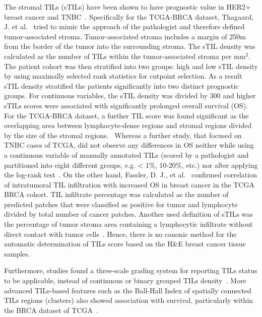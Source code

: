 The stromal TILs (sTILs) have been shown to have prognostic value in HER2+ breast cancer and TNBC~\cite{kos2020pitfalls}. 
Specifically for the TCGA-BRCA dataset, Thagaard, J. et al.~\cite{thagaard2021automated} tried to mimic the approach of the pathologist and therefore defined tumor-associated stroma. Tumor-associated stroma includes a margin of 250\textmu m from the border of the tumor into the surrounding stroma. The sTIL density was calculated as the number of TILs within the tumor-associated stroma per mm$^2$. The patient cohort was then stratified into two groups: high and low sTIL density by using maximally selected rank statistics for cutpoint selection. As a result sTIL density stratified the patients significantly into two distinct prognostic groups.  For continuous variables, the sTIL density was divided by 300 and higher sTILs scores were associated with significantly prolonged overall survival (OS). For the TCGA-BRCA dataset, a further TIL score was found significant as the overlapping area between lymphocyte-dense regions and stromal regions divided by the size of the stromal regions.~\cite{sun2021computational}  Whereas a further study, that focused on TNBC cases of TCGA, did not observe any differences in OS neither while using a continuous variable of manually annotated TILs (scored by a pathologist and partitioned into eight different groups, e.g. < 1\%, 10-20\%, etc.) nor after applying the log-rank test~\cite{craven2021cibersort}.
On the other hand, Fassler, D. J., et al.~\cite{fassler2022spatial} confirmed correlation of intratumoral TIL infiltration with increased OS in breast cancer in the TCGA BRCA cohort. TIL infiltrate percentage was calculated as the number of predicted patches that were classified as positive for tumor and lymphocyte divided by total number of cancer patches.
Another used definition of sTILs was the percentage of tumor stroma area containing a lymphocytic infiltrate without direct contact with tumor cells~\cite{meng2018distribution}.
Hence, there is no canonic method for the automatic determination of TILs score based on the H\&E breast cancer tissue samples.

Furthermore, studies found a three-scale grading system for reporting TILs status to be applicable, instead of continuous or binary grouped TILs density~\cite{kotoula2016tumors}. More advanced TILs-based features such as the Ball-Hall Index of spatially connected TILs regions (clusters) also showed association with survival, particularly within the BRCA dataset of TCGA~\cite{saltz2018spatial}. 